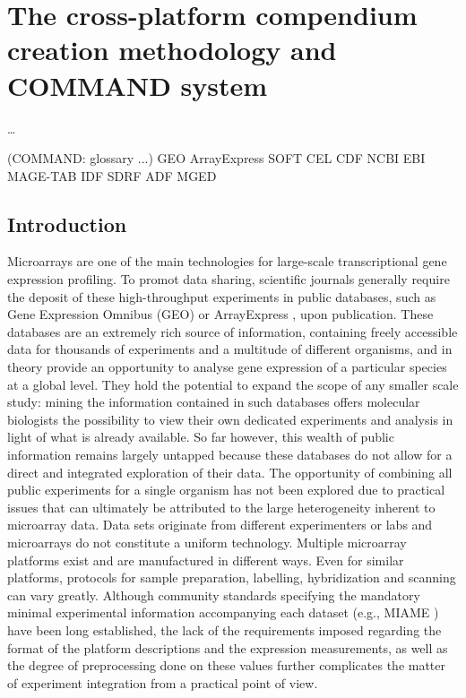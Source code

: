 \chapter{The cross-platform compendium creation methodology and COMMAND 
system}\label{ch:command}

\ldots

\instructionsintroduction


\todo(COMMAND: glossary ...)
GEO
ArrayExpress
SOFT
CEL
CDF
NCBI
EBI
MAGE-TAB
IDF
SDRF
ADF
MGED

\section{Introduction}

Microarrays are one of the main technologies for large-scale transcriptional
gene expression profiling.
%
To promot data sharing, scientific journals generally require the deposit of
these high-throughput experiments in public databases, such as Gene Expression
Omnibus (GEO) \cite{Barrett2011} or ArrayExpress \cite{Parkinson2009}, upon
publication.
%
These databases are an extremely rich source of information, containing freely
accessible data for thousands of experiments and a multitude of different
organisms, and in theory provide an opportunity to analyse gene expression of a
particular species at a global level.
%
They hold the potential to expand the scope of any smaller scale study: mining
the information contained in such databases offers molecular biologists the
possibility to view their own dedicated experiments and analysis in light of
what is already available.
%
So far however, this wealth of public information remains largely untapped
because these databases do not allow for a direct and integrated exploration of
their data.
%
The opportunity of combining all public experiments for a single organism has
not been explored due to practical issues that can ultimately be attributed to
the large heterogeneity inherent to microarray data.
%
Data sets originate from different experimenters or labs and microarrays do not
constitute a uniform technology.
%
Multiple microarray platforms exist and are manufactured in different ways.
Even for similar platforms, protocols for sample preparation, labelling,
hybridization and scanning can vary greatly.
%
Although community standards specifying the mandatory minimal experimental
information accompanying each dataset (e.g., MIAME \cite{Brazma2001}) have been
long established, the lack of the requirements \cite{Brazma2009} imposed
regarding the format of the platform descriptions and the expression
measurements, as well as the degree of preprocessing done on these values
further complicates the matter of experiment integration from a practical point
of view.


